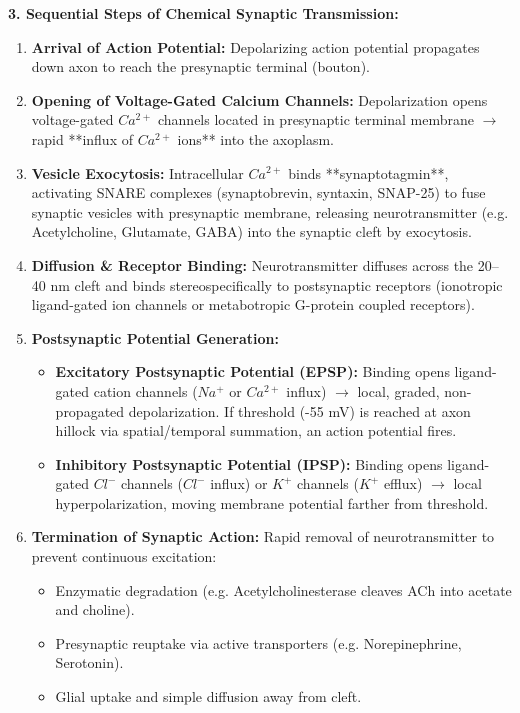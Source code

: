 \documentclass[11pt,a4paper]{article}
\begin{document}
\begin{ansbox}
\textbf{3. Sequential Steps of Chemical Synaptic Transmission:}
\begin{enumerate}[leftmargin=*]
    \item \textbf{Arrival of Action Potential:} Depolarizing action potential propagates down axon to reach the presynaptic terminal (bouton).
    \item \textbf{Opening of Voltage-Gated Calcium Channels:} Depolarization opens voltage-gated $Ca^{2+}$ channels located in presynaptic terminal membrane $\rightarrow$ rapid **influx of $Ca^{2+}$ ions** into the axoplasm.
    \item \textbf{Vesicle Exocytosis:} Intracellular $Ca^{2+}$ binds **synaptotagmin**, activating SNARE complexes (synaptobrevin, syntaxin, SNAP-25) to fuse synaptic vesicles with presynaptic membrane, releasing neurotransmitter (e.g. Acetylcholine, Glutamate, GABA) into the synaptic cleft by exocytosis.
    \item \textbf{Diffusion \& Receptor Binding:} Neurotransmitter diffuses across the 20--40 nm cleft and binds stereospecifically to postsynaptic receptors (ionotropic ligand-gated ion channels or metabotropic G-protein coupled receptors).
    \item \textbf{Postsynaptic Potential Generation:}
    \begin{itemize}
        \item \textbf{Excitatory Postsynaptic Potential (EPSP):} Binding opens ligand-gated cation channels ($Na^+$ or $Ca^{2+}$ influx) $\rightarrow$ local, graded, non-propagated depolarization. If threshold (-55 mV) is reached at axon hillock via spatial/temporal summation, an action potential fires.
        \item \textbf{Inhibitory Postsynaptic Potential (IPSP):} Binding opens ligand-gated $Cl^-$ channels ($Cl^-$ influx) or $K^+$ channels ($K^+$ efflux) $\rightarrow$ local hyperpolarization, moving membrane potential farther from threshold.
    \end{itemize}
    \item \textbf{Termination of Synaptic Action:} Rapid removal of neurotransmitter to prevent continuous excitation:
    \begin{itemize}
        \item Enzymatic degradation (e.g. Acetylcholinesterase cleaves ACh into acetate and choline).
        \item Presynaptic reuptake via active transporters (e.g. Norepinephrine, Serotonin).
        \item Glial uptake and simple diffusion away from cleft.
    \end{itemize}
\end{enumerate}
\end{ansbox}
\end{document}
